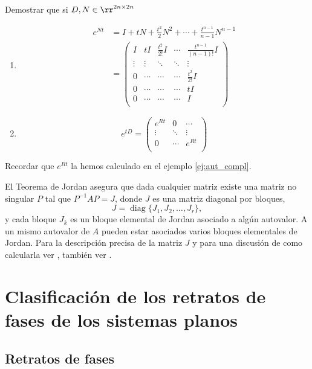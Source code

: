 \begin{ejercicio}{} Demostrar que si $D,N\in\rr^{2n\times 2n}$
\begin{enumerate}
\item
\[
 \begin{split}
e^{N t}&=I+t N+\frac{t^{2}}{2} N^{2}+\cdots+\frac{t^{n-1}}{n-1} N^{n-1}\\
        &=
        \begin{pmatrix}
            I & tI & \frac{t^2}{2!}I & \cdots & \frac{t^{n-1}}{(n-1) !}I  \\
            \vdots & \vdots &\ddots&\ddots & \vdots \\
              0 & \cdots &  \cdots &\cdots & \frac{t^2}{2!}I \\
            0 & \cdots &  \cdots &\cdots & tI \\
            0 & \cdots  & \cdots& \cdots & I \\
        \end{pmatrix}
\end{split}
\]
\item
\[
 e^{tD}=
\begin{pmatrix}
e^{Rt}&0 & \cdots \\
\vdots & \ddots& \vdots\\
0 &\cdots & e^{R t}\\
\end{pmatrix}
\]
\end{enumerate}
Recordar que $e^{Rt}$ la hemos calculado en el ejemplo \ref{ej:aut_compl}.
 
\end{ejercicio}

El Teorema de Jordan asegura que dada cualquier matriz existe una matriz no singular $P$ tal que $P^{-1}AP=J$, donde $J$ es una matriz diagonal por bloques, 
\[J=\operatorname{diag}\{J_1,J_2,\ldots,J_r\},\]
y cada bloque $J_k$ es un bloque elemental de Jordan asociado a algún autovalor. A un mismo autovalor de $A$ pueden estar asociados varios bloques elementales de Jordan. Para la descripción precisa de la matriz $J$ y para una discusión de como calcularla ver \cite{CarlD.Meyer538}, también ver \cite{alg_lin_repaso}.

\section{Clasificación de los retratos de fases de los sistemas planos}

\subsection{Retratos de fases}

